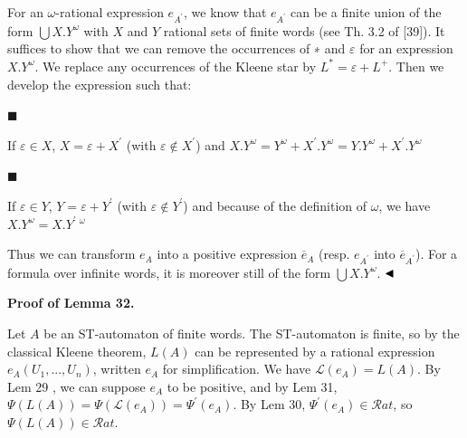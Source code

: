  
For an $\omega$-rational expression $e_{A^{\prime}}$, we know that $e_{A^{\prime}}$ can be a finite union of the form $\bigcup X.Y^{\omega}$ with $X$ and $Y$ rational sets of finite words (see Th. 3.2 of [39]). It suffices to show that we can remove the occurrences of ∗ and $\varepsilon$ for an expression $X.Y^{\omega}$. We replace any occurrences of the Kleene star by $L^{*}=\varepsilon+L^{+}$. Then we develop the expression such that:\par
  
\par\noindent  $\blacksquare$ 
 
If $\varepsilon\in X$, $X=\varepsilon+X^{\prime}$ (with $\varepsilon\not\in X^{\prime}$) and $X.Y^{\omega}=Y^{\omega}+X^{\prime}.Y^{\omega}=Y.Y^{\omega}+X^{\prime}.Y^{\omega}$\par
 
 
 
\par\noindent  $\blacksquare$ 
 
If $\varepsilon\in Y$, $Y=\varepsilon+Y^{\prime}$ (with $\varepsilon\not\in Y^{\prime}$) and because of the definition of \ensuremath{\omega}, we have $X.Y^{\omega}=X.Y^{\prime}\ {}^{\omega}$\par
 
 
  
Thus we can transform $e_{A}$ into a positive expression $\overline{e}_{A}$ (resp. $e_{A^{\prime}}$ into $\overline{e}_{A^{\prime}}$). For a formula over infinite words, it is moreover still of the form $\bigcup X.Y^{\omega}$. $\hfill\blacktriangleleft$\par
 
 
 
 
\par\medskip\noindent\textbf{Proof of Lemma 32.}\par
 
 
Let $A$ be an ST-automaton of finite words. The ST-automaton is finite, so by the classical Kleene theorem, $L(A)$ can be represented by a rational expression $e_{A}(U_{1},...,U_{n})$, written $e_{A}$ for simplification. We have $\mathcal{L}(e_{A})=L(A)$. By Lem 29 , we can suppose $e_{A}$ to be positive, and by Lem 31, $\Psi(L(A))=\Psi(\mathcal{L}(e_{A}))=\Psi^{\prime}(e_{A})$. By Lem 30, $\Psi^{\prime}(e_{A})\in\mathcal{R}at$, so $\Psi(L(A))\in\mathcal{R}at$.\par
 
